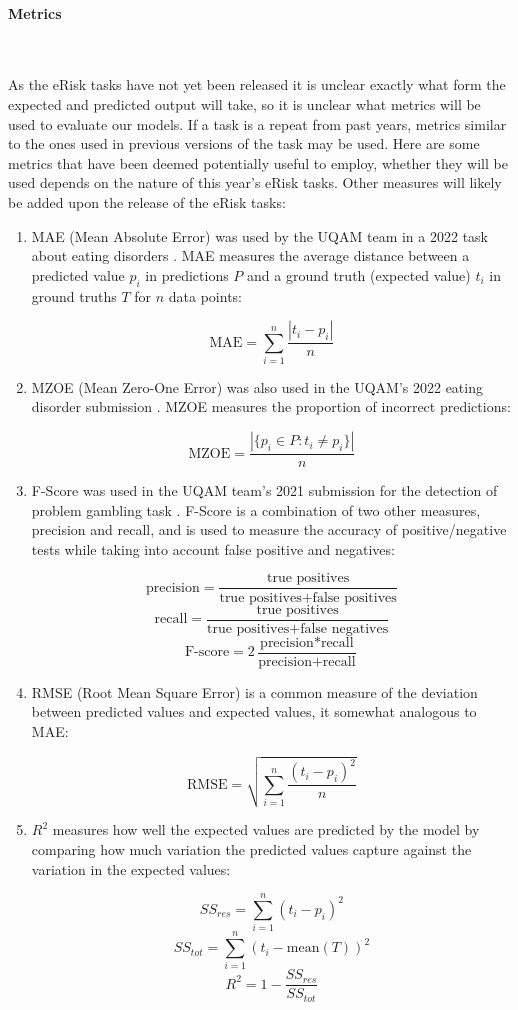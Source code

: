 \documentclass[12pt, titlepage]{article}
\newcommand{\myparagraph}[1]{\paragraph{#1}\mbox{}\\}
\begin{document}
\myparagraph{Metrics} \label{metrics}

As the eRisk tasks have not yet been released it is unclear exactly what form the expected and predicted output will take, so it is unclear what metrics will be used to evaluate our models. If a task is a repeat from past years, metrics similar to the ones used in previous versions of the task may be used. Here are some metrics that have been deemed potentially useful to employ, whether they will be used depends on the nature of this year's eRisk tasks. Other measures will likely be added upon the release of the eRisk tasks:

\begin{enumerate}

\item{MAE} (Mean Absolute Error) was used by the UQAM team in a 2022 task about eating disorders \citep{Saravani2022MeasuringTS}. MAE measures the average distance between a predicted value $p_i$ in predictions $P$ and a ground truth (expected value) $t_i$ in ground truths $T$ for $n$ data points:

$$\text{MAE} = \sum_{i=1}^{n} \frac{|t_i - p_i|}{n}$$

\item{MZOE} (Mean Zero-One Error) was also used in the UQAM's 2022 eating disorder submission \citep{Saravani2022MeasuringTS}. MZOE measures the proportion of incorrect predictions:

$$\text{MZOE} = \frac{|\{p_i \in P : t_i \neq p_i\}|}{n}$$

\item{F-Score} was used in the UQAM team's 2021 submission for the detection of problem gambling task \citep{Maupom2021EarlyDO}. F-Score is a combination of two other measures, precision and recall, and is used to measure the accuracy of positive/negative tests while taking into account false positive and negatives:

$$\text{precision} = \frac{\text{true positives}}{\text{true positives} + \text{false positives}}$$
$$\text{recall} = \frac{\text{true positives}}{\text{true positives} + \text{false negatives}}$$
$$\text{F-score} = 2\frac{\text{precision} * \text{recall}}{\text{precision} + \text{recall}}$$

\item{RMSE} (Root Mean Square Error) is a common measure of the deviation between predicted values and expected values, it somewhat analogous to MAE:

$$\text{RMSE} = \sqrt{\sum_{i=1}^{n} \frac{(t_i - p_i)^2}{n}}$$

\item{$R^2$} measures how well the expected values are predicted by the model by comparing how much variation the predicted values capture against the variation in the expected values:

$$SS_{res} = \sum_{i=1}^{n} (t_i - p_i)^2$$
$$SS_{tot} = \sum_{i=1}^{n} (t_i - \text{mean}(T))^2$$
$$R^2 = 1 - \frac{SS_{res}}{SS_{tot}}$$

\end{enumerate}
\end{document}
